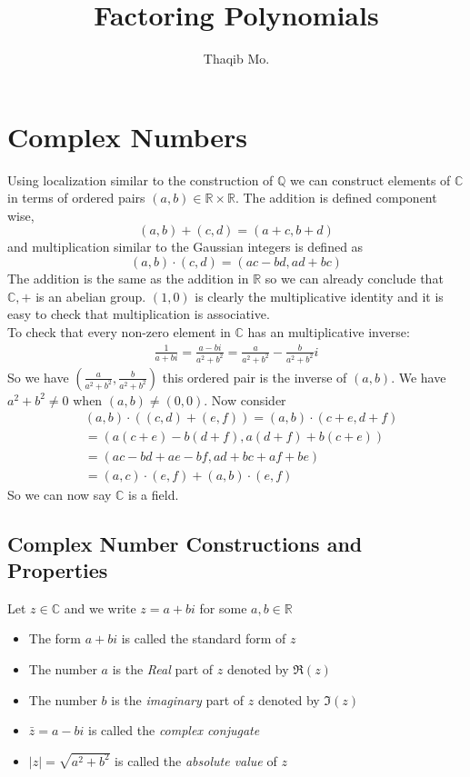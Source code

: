 \documentclass[16pt,a4paper]{article}
\author{Thaqib Mo.}
\title{ Factoring Polynomials }
\theoremstyle{definition}
\newcommand{\C}{\mathbb{C}}
\newcommand{\R}{\mathbb{R}}
\begin{document}
\maketitle
\newpage
\section{Complex Numbers}
Using localization similar to the construction of $\mathbb{Q}$ we can construct elements of $\C$ in terms of ordered pairs $(a,b)\in \R\times \R$. The addition is defined component wise, 
\[(a,b) + (c,d) = (a+c,b+d)\]
and multiplication similar to the Gaussian integers is defined as
\[(a,b)\cdot (c,d) = (ac-bd, ad+bc)\]
The addition is the same as the addition in $\R$ so we can already conclude that $\C,+$ is an abelian group. $(1,0)$ is clearly the multiplicative identity and it is easy to check that multiplication is associative. 
\\
To check that every non-zero element in $\C$ has an multiplicative inverse: 
\begin{align*}
\frac{1}{a+bi} = \frac{a-bi}{a^2 + b^2} = \frac{a}{a^2+b^2} - \frac{b}{a^2+b^2}i
\end{align*}
So we have $\left( \frac{a}{a^2+b^2}, \frac{b}{a^2+b^2}\right)$ this ordered pair is the inverse of $(a,b)$. We have $a^2 + b^2 \neq 0$ when $(a,b)\neq (0,0)$. Now consider 
\begin{align*}
& (a,b)\cdot ((c,d)+(e,f)) = (a,b)\cdot (c+e,d+f) \\
& = \left(a(c+e) - b(d+f), a(d+f) + b(c+e)\right) \\
& = \left(ac- bd + ae -bf, ad+ bc +af +be\right) \\
& = (a,c)\cdot (e,f) + (a,b)\cdot (e,f)
\end{align*} 
So we can now say $\C$ is a field. 

\subsection{Complex Number Constructions and Properties}
\begin{defn}{}{}
Let $z\in\C$ and we write $z=a+bi$ for some $a,b \in \R$
\begin{itemize}
\item The form $a+bi$ is called the standard form of $z$ 
\item The number $a$ is the \emph{Real} part of $z$ denoted by $\Re(z)$ 
\item The number $b$ is the \emph{imaginary} part of $z$ denoted by $\Im(z)$
\item $\bar{z} = a-bi$ is called the \emph{complex conjugate}
\item $|z| = \sqrt{a^2 + b^2}$ is called the \emph{absolute value} of $z$
\end{itemize}
\end{defn}
\end{document}
